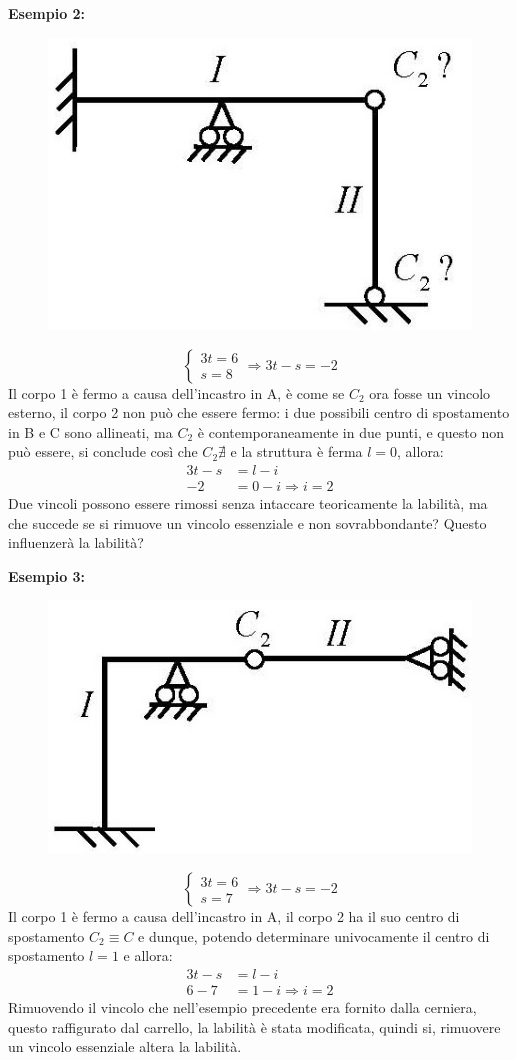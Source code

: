 \documentclass{article}
\begin{document}
\begin{adjustwidth}{2in}{}
\textbf{Esempio 2:} \newline 
\begin{figure}[H]
	\centering
	\includegraphics[width=0.2\linewidth]{immagini/1.PARTE4_Pagina_06 (1)}
\end{figure}
\[
\begin{cases}
	3t=6 \\
	s=8 
\end{cases} \Rightarrow 3t-s=-2
\]
Il corpo 1 è fermo a causa dell'incastro in A, è come se $C_2$ ora fosse un vincolo esterno, il corpo 2 non può che essere fermo: i due possibili centro di spostamento in B e C sono allineati, ma $C_2$ è contemporaneamente in due punti, e questo non può essere, si conclude così che $C_2 \nexists$ e la struttura è ferma $l =0$, allora:
\[
\begin{split}
	3t-s & = l - i \\
	-2 & = 0 - i \Rightarrow i = 2
\end{split}  
\]
Due vincoli possono essere rimossi senza intaccare teoricamente la labilità, ma che succede se si rimuove un vincolo essenziale e non sovrabbondante? Questo influenzerà la labilità? 

\newpage

\textbf{Esempio 3:} \newline 
\begin{figure}[H]
	\centering
	\includegraphics[width=0.2\linewidth]{immagini/1.PARTE4_Pagina_06}
\end{figure}
\[
\begin{cases}
	3t=6 \\
	s=7 
\end{cases} \Rightarrow 3t-s=-2
\]
Il corpo 1 è fermo a causa dell'incastro in A, il corpo 2 ha il suo centro di spostamento $C_2 \equiv C$ e dunque, potendo determinare univocamente il centro di spostamento $l=1$ e allora:
\[
\begin{split}
	3t-s & = l - i \\
	6-7 & = 1 - i \Rightarrow i = 2
\end{split}  
\]
Rimuovendo il vincolo che nell'esempio precedente era fornito dalla cerniera, questo raffigurato dal carrello, la labilità è stata modificata, quindi si, rimuovere un vincolo essenziale altera la labilità. \newline 


\end{adjustwidth}
\end{document}
